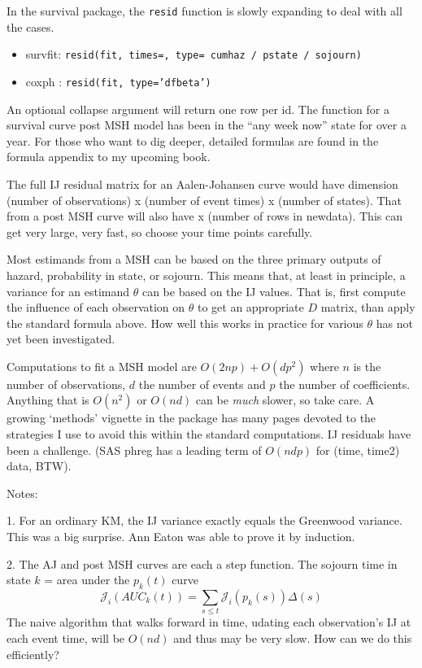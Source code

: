 \documentclass{article}\usepackage[]{graphicx}\usepackage[]{xcolor}
\newcommand{\code}[1]{\texttt{#1}}
\begin{document}
In the survival package, the \code{resid} function is slowly expanding to
deal with all the cases.
\begin{itemize}
  \item survfit:  \code{resid(fit, times=, type= cumhaz / pstate / sojourn)}
  \item coxph  :  \code{resid(fit, type='dfbeta')}
\end{itemize}
An optional collapse argument will return one row per id.
The function for a survival curve post MSH model has been in the ``any week now''
state for over a year.
For those who want to dig deeper, detailed formulas are found in the formula
appendix to my upcoming book.

The full IJ residual matrix for an Aalen-Johansen curve would have dimension
(number of observations) x (number of event times) x (number of states).
That from a post MSH curve will also have x (number of rows in newdata).
This can get very large, very fast, so choose your time points carefully.

Most estimands from a MSH can be based on the three primary outputs of hazard,
probability in state, or sojourn. 
This means that, at least in principle, a variance for an estimand $\theta$ 
can be based on the IJ values.
That is, first compute the influence of each observation on $\theta$ to get
an appropriate $D$ matrix, than apply the standard formula above.
How well this works in practice for various $\theta$ has not yet 
been investigated.

Computations to fit a MSH model are $O(2np) + O(dp^2)$ where $n$ is the number
of observations, $d$ the number of events and $p$ the number of coefficients.
Anything that is $O(n^2)$ or $O(nd)$ can be \emph{much} slower, so take care.
A growing `methods' vignette in the package has many pages devoted to the 
strategies I use to avoid this within the standard computations.
IJ residuals have been a challenge.
(SAS phreg has a leading term of $O(ndp)$ for (time, time2) data, BTW).

Notes:

1. For an ordinary KM, the IJ variance exactly equals the Greenwood variance.
This was a big surprise.  Ann Eaton was able to prove it by induction.

2. The AJ and post MSH curves are each a step function. 
The sojourn time in state $k$ = area under the $p_k(t)$ curve 
$$
\mathcal{J}_i(AUC_k(t)) = \sum_{s \le t} \mathcal{J}_i(p_k(s)) \Delta(s)$$
The naive algorithm that walks forward in time, udating each observation's
IJ at each event time, will be $O(nd)$ and thus may be very slow.  
How can we do this efficiently?
\end{document}
